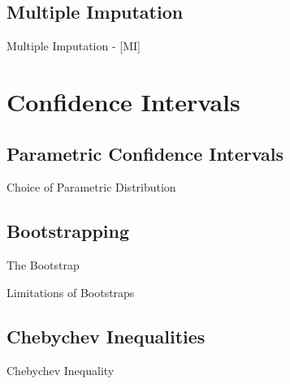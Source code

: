 \documentclass{beamer}
\begin{document}
\subsection{Multiple Imputation}

\begin{frame}{Multiple Imputation - [MI] }

\end{frame}



\section{Confidence Intervals}

\subsection{Parametric Confidence Intervals}

\begin{frame}{Choice of Parametric Distribution}

\end{frame}


\subsection{Bootstrapping}

\begin{frame}{The Bootstrap}

\end{frame}
 
\begin{frame}{Limitations of Bootstraps}

\end{frame}

\subsection{Chebychev Inequalities}

\begin{frame}{Chebychev Inequality}

\end{frame}
\end{document}
